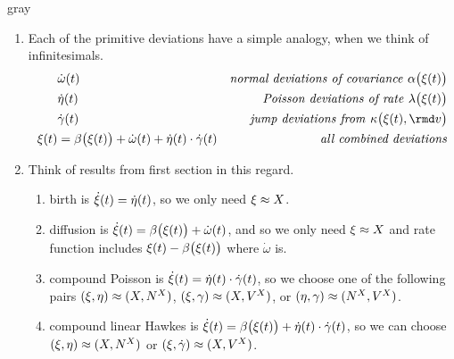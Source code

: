 \begin{color}{gray}
\begin{enumerate}
    \item
      Each of the primitive deviations have a simple analogy, when we think of infinitesimals.
      \begin{align*}
        &\dot\omega(t)  & \text{\emph{normal deviations of covariance }} \affDiff\big(\pathVar(t)\big) \\
        &\dot\eta(t) & \text{\emph{Poisson deviations of rate }} \affInt\big(\pathVar(t)\big) \\
        &\dot\gamma(t) & \text{\emph{jump deviations from }} \affDist\big(\pathVar(t), \rmd\markVar\big) \\
        \pathVar(t) &=\affDrift\big(\pathVar(t)\big) + \dot\omega(t) + \dot\eta(t)\cdot\dot\gamma(t) & \text{\emph{all combined deviations}}
      \end{align*}
    \item
      Think of results from first section in this regard.
      \begin{enumerate}
        \item
          birth is  $\dot{\xi}(t) = \dot\eta(t)$, so we only need $\xi \approx X$.
        \item
          diffusion is $\dot{\xi}(t) = \beta\big(\xi(t)\big) + \dot\omega(t)$, and so we only need $\xi\approx X$ and rate function includes $\xi(t) - \beta\big(\xi(t)\big)$ where $\dot\omega$ is.
        \item
          compound Poisson is $\dot{\xi}(t) = \dot\eta(t) \cdot \dot\gamma(t)$, so we choose one of the following pairs $(\xi, \eta) \approx (X, N^X)$, $(\xi, \gamma) \approx (X, V^X)$, or $(\eta, \gamma) \approx (N^X, V^X)$.
        \item
          compound linear Hawkes is $\dot{\xi}(t) = \beta\big(\xi(t)\big) + \dot\eta(t) \cdot \dot\gamma(t)$, so we can choose $(\xi, \eta) \approx (X, N^X)$ or $(\xi, \dot\gamma) \approx (X, V^X)$.
      \end{enumerate}
  \end{enumerate}
\end{color}

